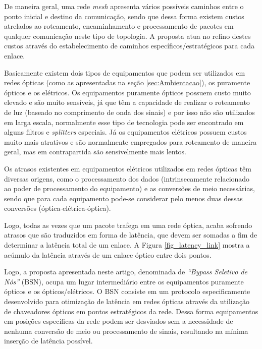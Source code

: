 \documentclass[12pt]{article}
\begin{document}
De maneira geral, uma rede \emph{mesh} apresenta vários possíveis caminhos entre o ponto inicial e destino da comunicação, sendo que dessa forma existem custos atrelados ao roteamento, encaminhamento e processamento de pacotes em qualquer comunicação neste tipo de topologia. A proposta atua no refino destes custos através do estabelecimento de caminhos específicos/estratégicos para cada enlace.

Basicamente existem dois tipos de equipamentos que podem ser utilizados em redes ópticas (como as apresentadas na seção \ref{sec:Ambientacao}), os puramente ópticos e os elétricos. Os equipamentos puramente ópticos possuem custo muito elevado e são muito sensíveis, já que têm a capacidade de realizar o roteamento de luz (baseado no comprimento de onda dos sinais) e por isso não são utilizados em larga escala, normalmente esse tipo de tecnologia pode ser encontrado em alguns filtros e \emph{splitters} especiais. Já os equipamentos elétricos possuem custos muito mais atrativos e são normalmente empregados para roteamento de maneira geral, mas em contrapartida são sensivelmente mais lentos.

Os atrasos existentes em equipamentos elétricos utilizados em redes ópticas têm diversas origens, como o processamento dos dados (intrinsecamente relacionado ao poder de processamento do equipamento) e as conversões de meio necessárias, sendo que para cada equipamento pode-se considerar pelo menos duas dessas conversões (óptica-elétrica-óptica). 

Logo, todas as vezes que um pacote trafega em uma rede óptica, acaba sofrendo atrasos que são traduzidos em forma de latência, que devem ser somadas a fim de determinar a latência total de um enlace. A Figura \ref{fig_latency_link} mostra a acúmulo da latência através de um enlace óptico entre dois pontos. 

Logo, a proposta apresentada neste artigo, denominada de \emph{``Bypass Seletivo de Nós''} (BSN), ocupa um lugar intermediário entre os equipamentos puramente ópticos e os ópticos/elétricos. O BSN consiste em um protocolo especificamente desenvolvido para otimização de latência em redes ópticas através da utilização de chaveadores ópticos em pontos estratégicos da rede. Dessa forma equipamentos em posições específicas da rede podem ser desviados sem a necessidade de nenhuma conversão de meio ou processamento de sinais, resultando na mínima inserção de latência possível. 
\end{document}
